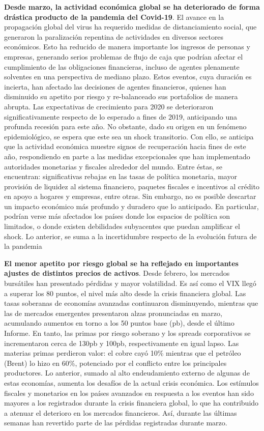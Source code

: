 \documentclass[
]{book}
\begin{document}
\textbf{Desde marzo, la actividad económica global se ha deteriorado de forma drástica producto de la pandemia del Covid-19}.
El avance en la propagación global del virus ha requerido medidas de distanciamiento
social, que generaron la paralización repentina de actividades en diversos
sectores económicos. Esto ha reducido de manera importante los ingresos de
personas y empresas, generando serios problemas de flujo de caja que podrían
afectar el cumplimiento de las obligaciones financieras, incluso de agentes
plenamente solventes en una perspectiva de mediano plazo. Estos eventos,
cuya duración es incierta, han afectado las decisiones de agentes financieros,
quienes han disminuido su apetito por riesgo y re-balanceado sus portafolios
de manera abrupta. Las expectativas de crecimiento para 2020 se deterioraron
significativamente respecto de lo esperado a fines de 2019, anticipando una
profunda recesión para este año. No obstante, dado su origen en un fenómeno
epidemiológico, se espera que este sea un shock transitorio. Con ello, se
anticipa que la actividad económica muestre signos de recuperación hacia
fines de este año, respondiendo en parte a las medidas excepcionales que han
implementado autoridades monetarias y fiscales alrededor del mundo. Entre
éstas, se encuentran: significativas rebajas en las tasas de política monetaria,
mayor provisión de liquidez al sistema financiero, paquetes fiscales e incentivos
al crédito en apoyo a hogares y empresas, entre otras. Sin embargo, no es
posible descartar un impacto económico más profundo y duradero que lo
anticipado. En particular, podrían verse más afectados los países donde los
espacios de política son limitados, o donde existen debilidades subyacentes que
puedan amplificar el shock. Lo anterior, se suma a la incertidumbre respecto de
la evolución futura de la pandemia

\textbf{El menor apetito por riesgo global se ha reflejado en importantes ajustes de distintos precios de activos}. Desde febrero, los mercados
bursátiles han presentado pérdidas y mayor volatilidad. Es así como el VIX llegó
a superar los 80 puntos, el nivel más alto desde la crisis financiera global. Las
tasas soberanas de economías avanzadas continuaron disminuyendo, mientras
que las de mercados emergentes presentaron alzas pronunciadas en marzo,
acumulando aumentos en torno a los 50 puntos base (pb), desde el último
Informe. En tanto, las primas por riesgo soberano y los spreads corporativos se
incrementaron cerca de 130pb y 100pb, respectivamente en igual lapso. Las
materias primas perdieron valor: el cobre cayó 10\% mientras que el petróleo
(Brent) lo hizo en 60\%, potenciado por el conflicto entre los principales
productores. Lo anterior, sumado al alto endeudamiento externo de algunas
de estas economías, aumenta los desafíos de la actual crisis económica. Los
estímulos fiscales y monetarios en los países avanzados en respuesta a los
eventos han sido mayores a los registrados durante la crisis financiera global,
lo que ha contribuido a atenuar el deterioro en los mercados financieros. Así,
durante las últimas semanas han revertido parte de las pérdidas registradas
durante marzo.
\end{document}
